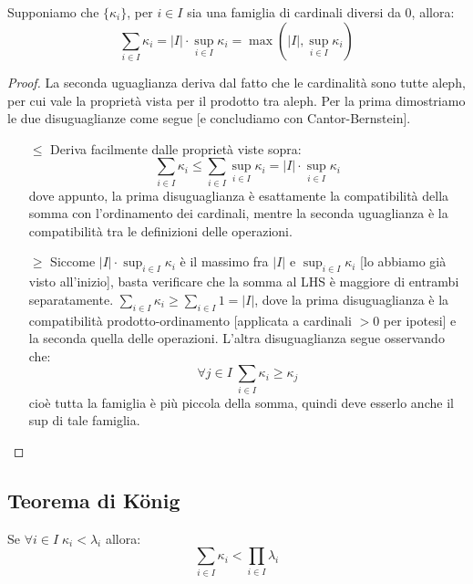 \pagebreak
\begin{proposition}
	Supponiamo che $\{\kappa_i\}$, per $i \in I$ sia una famiglia di cardinali diversi da 0, allora:
	\[ \sum_{i \in I}\kappa_i = |I| \cdot \sup_{i \in I} \kappa_i = \max\left(|I|, \sup_{i \in I}\kappa_i\right)
		\]
\end{proposition}

\begin{proof}
	La seconda uguaglianza deriva dal fatto che le cardinalità sono tutte aleph, per cui vale la proprietà vista per il prodotto tra aleph. Per la prima dimostriamo le due disuguaglianze come segue [e concludiamo con Cantor-Bernstein].
	\begin{itemize}
		\item[$\boxed{\leq}$] Deriva facilmente dalle proprietà viste sopra:
		\[ \sum_{i \in I} \kappa_i \leq \sum_{i \in I} \sup_{i \in I}\kappa_i = |I| \cdot \sup_{i \in I} \kappa_i
			\]
		dove appunto, la prima disuguaglianza è esattamente la compatibilità della somma con l'ordinamento dei cardinali, mentre la seconda uguaglianza è la compatibilità tra le definizioni delle operazioni.
		\item[$\boxed{\geq}$] Siccome $|I| \cdot \sup_{i \in I} \kappa_i$ è il massimo fra $|I|$ e $\sup_{i \in I} \kappa_i$ [lo abbiamo già visto all'inizio], basta verificare che la somma al LHS è maggiore di entrambi separatamente.
		$\sum_{i \in I}\kappa_i \geq \sum_{i \in I} 1 = |I|$, dove la prima disuguaglianza è la compatibilità prodotto-ordinamento [applicata a cardinali $>0$ per ipotesi] e la seconda quella delle operazioni. L'altra disuguaglianza segue osservando che:
		\[ \forall j \in I \; \sum_{i \in I} \kappa_i \geq \kappa_j
			\]
		cioè tutta la famiglia è più piccola della somma, quindi deve esserlo anche il sup di tale famiglia.
	\end{itemize}
\end{proof}

\subsection{Teorema di König}

\begin{proposition}
	Se $\forall i \in I \; \kappa_i < \lambda_i$ allora:
	\[ \sum_{i \in I} \kappa_i < \prod_{i \in I} \lambda_i
		\]
\end{proposition}

